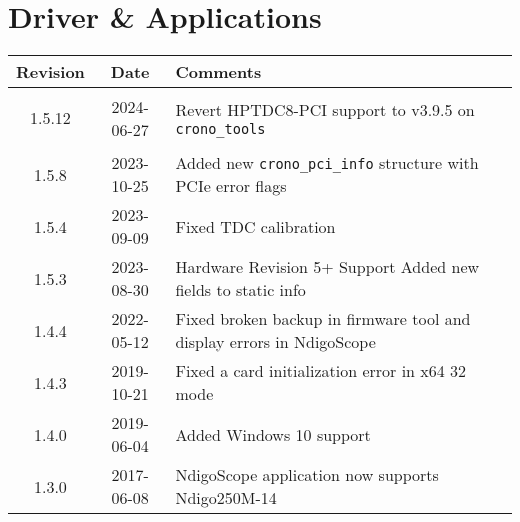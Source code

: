 \section{Driver \& Applications}
\begin{tabularx}{\textwidth}{|c|c|X|}
    \hline
    Revision & Date & Comments\\
    \hline\hline
    \hypertarget{drvrev}{1.5.12} & 2024-06-27 & Revert HPTDC8-PCI support to v3.9.5 on \texttt{crono\_tools}\\
    \hline
    1.5.8 & 2023-10-25 & Added new \texttt{crono\_pci\_info} structure with PCIe error flags\\
    \hline
    1.5.4 & 2023-09-09 & Fixed TDC calibration\\
    \hline
    1.5.3 & 2023-08-30 & 
        Hardware Revision 5+ Support\newline
        Added new fields to static info\newline
    \\
    \hline
    1.4.4 & 2022-05-12 & Fixed broken backup in firmware tool and display errors in NdigoScope\\
    \hline
    1.4.3 & 2019-10-21 & Fixed a card initialization error in x64 32 mode\\
    \hline
    1.4.0 & 2019-06-04 & Added Windows 10 support\\
    \hline
    1.3.0 & 2017-06-08 & NdigoScope application now supports Ndigo250M-14\\
    \hline
\end{tabularx}